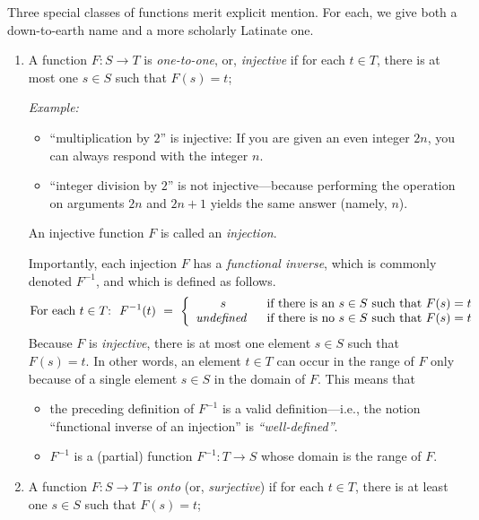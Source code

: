 \medskip

Three special classes of functions merit explicit mention.  For each, we give both a down-to-earth name and a more scholarly Latinate one.
\begin{enumerate}
\item
A function $F: S \rightarrow T$ is {\it one-to-one}, or, {\it injective} if for each $t \in T$, there is at most one $s \in S$ such that $F(s) = t$;

\medskip

{\em Example:}
\begin{itemize}
\item
 ``multiplication by $2$'' is injective: If you are given an even integer $2n$, you can always respond with the integer $n$.
\medskip\item
``integer division by $2$'' is not injective---because performing the operation on arguments $2n$ and $2n+1$ yields the same answer (namely, $n$).
\end{itemize}

An injective function $F$ is called an {\it injection}.

\smallskip

 

Importantly, each injection $F$ has a {\it functional inverse}, which is commonly denoted $F^{-1}$, and which is defined as follows.
\[
\mbox{For each $t \in T$:} \ \
F^{-1}(t) \ = \ \left\{
\begin{array}{cl}
s &
\mbox{ if there is an $s \in S$ such that $F(s) = t$} \\
\mbox{\it undefined } &
\mbox{ if there is no $s \in S$ such that $F(s) = t$}
\end{array}
\right.
\]
Because $F$ is {\em injective}, there is at most one element $s \in S$ such that $F(s)= t$.  In other words, an element $t \in T$ can occur in the range of $F$ only because of a single element $s \in S$ in the domain of $F$.  This means that
\begin{itemize}
\item
the preceding definition of $F^{-1}$ is a valid definition---i.e., the notion ``functional inverse of an injection'' is {\it ``well-defined''}.
\medskip\item
$F^{-1}$ is a (partial) function $F^{-1}: T \rightarrow S$ whose domain is the range of $F$.
\end{itemize}

\medskip\item
A function $F: S \rightarrow T$ is {\it onto} (or, {\it surjective}) if for each $t \in T$, there is at least one $s \in S$ such that $F(s) = t$;


\end{enumerate}
